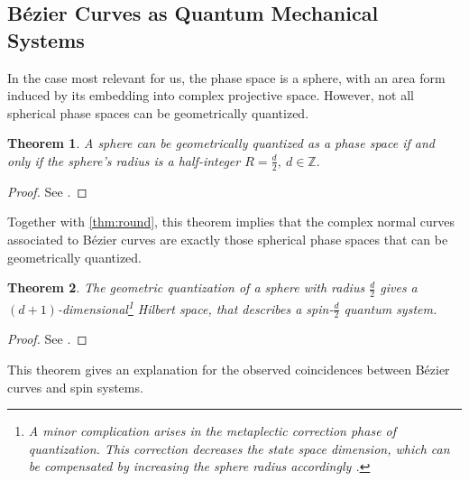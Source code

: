 \documentclass[12pt,final,3p]{elsarticle}
\newtheorem{theorem}{Theorem}
\begin{document}
\subsection{B\'{e}zier Curves as Quantum Mechanical Systems}
In the case most relevant for us, the phase space is a sphere, with an area form induced by its embedding into complex projective space. However, not all spherical phase spaces can be geometrically quantized.  
\begin{theorem}
	A sphere can be geometrically quantized as a phase space if and only if the sphere's radius is a half-integer $R = \frac{d}{2},\ d \in \mathbb{Z}.$
\end{theorem} 
\begin{proof}
	See \cite{nlab2016geometric}.
\end{proof}
Together with \autoref{thm:round}, this theorem implies that the complex normal curves associated to B\'{e}zier curves are exactly those spherical phase spaces that can be geometrically quantized.
\begin{theorem}
	The geometric quantization of a sphere with radius $\frac{d}{2}$ gives a $(d+1)$-dimensional\footnote{A minor complication arises in the metaplectic correction phase of quantization. This correction decreases the state space dimension, which can be compensated by increasing the sphere radius accordingly \cite{nlab2016geometric}.} Hilbert space, that describes a spin-$\frac{d}{2}$ quantum system. 
\end{theorem}
\begin{proof}
	See \cite[Ch. 4.2]{blau1992symplectic}.
\end{proof}
This theorem gives an explanation for the observed coincidences between B\'{e}zier curves and spin systems. 
\end{document}
